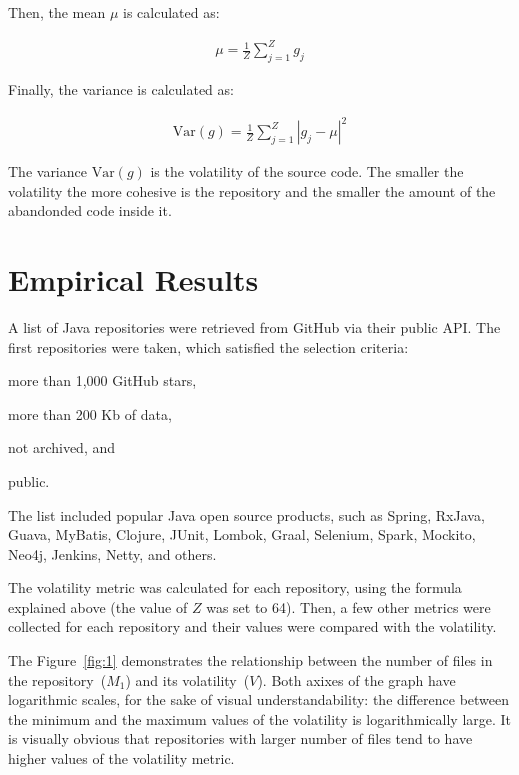 \documentclass[sigconf]{acmart}
\begin{document}
Then, the mean $\mu$ is calculated as:

\begin{eqnarray}
\mu = \frac{1}{Z}\sum_{j=1}^{Z}{g_j}
\end{eqnarray}

Finally, the variance is calculated as:

\begin{eqnarray}
\text{Var}(g) = \frac{1}{Z}\sum_{j=1}^{Z}{|g_j - \mu|^2}
\end{eqnarray}

The variance $\text{Var}(g)$ is the volatility of the source code. The smaller
the volatility the more cohesive is the repository and the smaller
the amount of the abandonded code inside it.

\section{Empirical Results}
\label{sec:results}

A list of Java repositories were retrieved from GitHub via their
public API. The first \thetotalrepos{} repositories were taken, which satisfied
the selection criteria:
\begin{enumerate*}[label={\arabic*)}]
\item more than 1,000 GitHub stars,
\item more than 200 Kb of data,
\item not archived, and
\item public.
\end{enumerate*}
The list included popular Java open source products, such as
Spring, RxJava, Guava, MyBatis, Clojure, JUnit, Lombok,
Graal, Selenium, Spark, Mockito, Neo4j, Jenkins, Netty, and others.

The volatility metric was calculated for each repository, using the
formula explained above (the value of $Z$ was set to 64).
Then, a few other metrics were collected
for each repository and their values were compared with the volatility.

The Figure~\ref{fig:1} demonstrates the relationship between
the number of files in the repository~($M_1$) and its volatility~($V$). Both
axixes of the graph have logarithmic scales, for the sake of visual
understandability: the difference between the minimum and the maximum values
of the volatility is logarithmically large. It is visually obvious that
repositories with larger number of files tend to have higher values
of the volatility metric.
\end{document}

